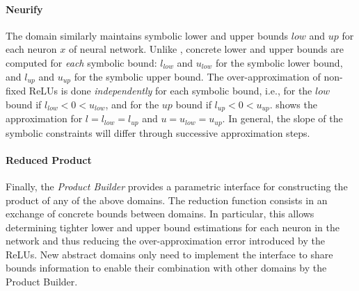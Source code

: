 \paragraph{Neurify}

The \neurify{} domain similarly maintains symbolic lower and upper bounds $low$ and $up$ for each neuron $x$ of neural network. Unlike \deeppoly, concrete lower and upper bounds are computed for \emph{each} symbolic bound: $l_{low}$ and $u_{low}$ for the symbolic lower bound, and $l_{up}$ and $u_{up}$ for the symbolic upper bound.
%
The over-approximation of non-fixed ReLUs is done \emph{independently} for each symbolic bound, i.e., for the $low$ bound if $l_{low} < 0 < u_{low}$, and for the $up$ bound if $l_{up} < 0 < u_{up}$.
%
 shows the approximation for $l = l_{low} = l_{up}$ and $u = u_{low} = u_{up}$. In general, the slope of the symbolic constraints will differ through successive approximation steps.

\paragraph{Reduced Product}

Finally, the \emph{Product Builder} provides a parametric interface for constructing the product of any of the above domains.
The reduction function consists in an exchange of concrete bounds between domains. In particular, this allows determining tighter lower and upper bound estimations for each neuron in the network and thus reducing the over-approximation error introduced by the ReLUs.
New abstract domains only need to implement the interface to share bounds information to enable their combination with other domains by the Product Builder.
